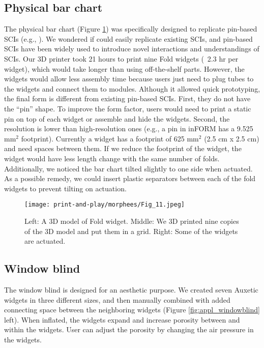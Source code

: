     \subsection{Physical bar chart}
      The physical bar chart (Figure \ref{fig:appl_barchart}) was specifically
      designed to replicate pin-based SCIs (e.g., \cite{Follmer:2013,
      Nakagaki:2016jt, Everitt:2016, Hardy:2015dx}).  We wondered if \mp could
      easily replicate existing SCIs, and pin-based SCIs have been widely used
      to introduce novel interactions and understandings of SCIs.  Our 3D
      printer took 21 hours to print nine Fold widgets (~2.3 hr per widget),
      which would take longer than using off-the-shelf parts. However, the
      widgets would allow less assembly time because users just need to plug
      tubes to the widgets and connect them to modules.  Although it allowed
      quick prototyping, the final form is different from existing pin-based
      SCIs. First, they do not have the ``pin'' shape. To improve the form
      factor, users would need to print a static pin on top of each widget or
      assemble and hide the widgets. Second, the resolution is lower than
      high-resolution ones (e.g., a pin in inFORM \cite{Follmer:2013} has a
      9.525 mm$^2$ footprint). Currently a widget has a footprint of 625 mm$^2$
      (2.5 cm x 2.5 cm) and need spaces between them. If we reduce the footprint
      of the widget, the widget would have less length change with the same
      number of folds. Additionally, we noticed the bar chart tilted slightly to
      one side when actuated. As a possible remedy, we could insert plastic
      separators between each of the fold widgets to prevent tilting on
      actuation.
        
      \begin{figure}[htb]
        \centering
        \texttt{[image: print-and-play/morphees/Fig\_11.jpeg]}
        \caption{Left: A 3D model of Fold widget. Middle: We 3D printed nine
          copies of the 3D model and put them in a grid. Right: Some of the
          widgets are actuated.}
        \label{fig:appl_barchart}
      \end{figure}
    
    \subsection{Window blind}
      The window blind is designed for an aesthetic purpose. We created seven
      Auxetic widgets in three different sizes, and then manually combined with
      added connecting space between the neighboring widgets
      (Figure \ref{fig:appl_windowblind} left). When inflated, the widgets
      expand and increase porosity between and within the widgets. User can
      adjust the porosity by changing the air pressure in the widgets.
        
